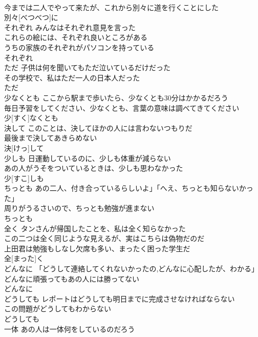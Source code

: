 \documentclass[8pt]{extreport}
\begin{document}
\begin{CJK}{UTF8}{min}
\\	今までは二人でやって来たが、これから別々に道を行くことにした 
\\	別々[べつべつ]に			
\\	それぞれ	みんなはそれぞれ意見を言った 
\\	これらの絵には、それぞれ良いところがある 
\\	うちの家族のそれぞれがパソコンを持っている 
\\	それぞれ			
\\	ただ	子供は何を聞いてもただ泣いているだけだった 
\\	その学校で、私はただ一人の日本人だった 
\\	ただ			
\\	少なくとも	ここから駅まで歩いたら、少なくとも30分はかかるだろう 
\\	毎日予習をしてください、少なくとも、言葉の意味は調べてきてください 
\\	少[すく]なくとも			
\\	決して	このことは、決してほかの人には言わないつもりだ 
\\	最後まで決してあきらめない 
\\	決[けっ]して			
\\	少しも	日運動しているのに、少しも体重が減らない 
\\	あの人がうそをついているときは、少しも思わなかった 
\\	少[すこ]しも			
\\	ちっとも	あの二人、付き合っているらしいよ」「へえ、ちっとも知らないかっ た」 
\\	周りがうるさいので、ちっとも勉強が進まない 
\\	ちっとも			
\\	全く	タンさんが帰国したことを、私は全く知らなかった 
\\	この二つは全く同じような見えるが、実はこちらは偽物だのだ 
\\	上田君は勉強もしなし欠席も多い、まったく困った学生だ 
\\	全[まった]く						
\\	どんなに	「どうして連絡してくれないかったの,どんなに心配したが、わかる」 
\\	どんなに頑張ってもあの人には勝ってない 
\\	どんなに			
\\	どうしても	レポートはどうしても明日までに完成させなければならない 
\\	この問題がどうしてもわからない 
\\	どうしても			
\\	一体	あの人は一体何をしているのだろう 

\end{CJK}
\end{document}
